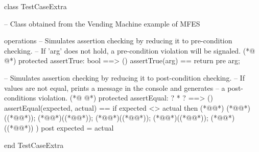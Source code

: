 \begin{vdmpp}[breaklines=true]
class TestCaseExtra

 -- Class obtained from the Vending Machine example of MFES
 
 
 operations
 -- Simulates assertion checking by reducing it to pre-condition checking.
 -- If 'arg' does not hold, a pre-condition violation will be signaled.
(*@
\label{assertTrue:9}
@*)
 protected assertTrue: bool ==> ()
 assertTrue(arg) == 
  return 
 pre arg;
  
 -- Simulates assertion checking by reducing it to post-condition checking.
 -- If values are not equal, prints a message in the console and generates 
 -- a post-conditions violation.
(*@
\label{assertEqual:17}
@*)
 protected assertEqual: ? * ? ==> ()
 assertEqual(expected, actual) == 
  if expected <> actual then (*@\vdmnotcovered{(}@*)
     (*@@*)((*@@*));
     (*@@*)((*@@*)); 
     (*@@*)((*@@*));
     (*@@*)((*@@*));
     (*@@*)((*@@*))
  )
 post expected = actual
 
end TestCaseExtra


\end{vdmpp}
